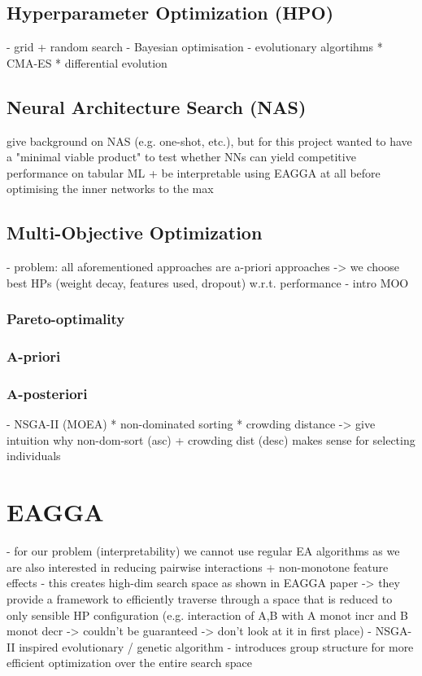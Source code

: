\documentclass[twoside,11pt]{article}
\begin{document}
\subsection{Hyperparameter Optimization (HPO)}
- grid + random search
- Bayesian optimisation
- evolutionary algortihms
  * CMA-ES
  * differential evolution
  

\subsection{Neural Architecture Search (NAS)}
give background on NAS (e.g. one-shot, etc.), but for this project wanted to have a "minimal viable product" to test whether NNs can yield competitive performance
on tabular ML + be interpretable using EAGGA at all before optimising the inner networks to the max

\subsection{Multi-Objective Optimization}
- problem: all aforementioned approaches are a-priori approaches -> we choose best HPs (weight decay, features used, dropout) w.r.t. performance
- intro MOO
\subsubsection{Pareto-optimality}
\subsubsection{A-priori}
\subsubsection{A-posteriori}
- NSGA-II (MOEA)
  * non-dominated sorting
  * crowding distance
  -> give intuition why non-dom-sort (asc) + crowding dist (desc) makes sense for selecting individuals


\section{EAGGA}
- for our problem (interpretability) we cannot use regular EA algorithms as we are also interested in reducing pairwise interactions + non-monotone feature effects
- this creates high-dim search space as shown in EAGGA paper -> they provide a framework to efficiently traverse through a space that is reduced to only sensible HP
  configuration (e.g. interaction of A,B with A monot incr and B monot decr -> couldn't be guaranteed -> don't look at it in first place)
- NSGA-II inspired evolutionary / genetic algorithm
- introduces group structure for more efficient optimization over the entire search space
\end{document}
